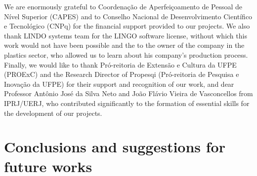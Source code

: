 \documentclass[preprint,12pt,authoryear]{elsarticle}
\begin{document}
We are enormously grateful to Coordenação de Aperfeiçoamento de Pessoal de Nível Superior (CAPES) and to Conselho Nacional de Desenvolvimento Científico e Tecnológico (CNPq) for the financial support provided to our projects. We also thank LINDO systems team for the LINGO software license, without which this work would not have been possible and the to the owner of the company in the plastics sector, who allowed us to learn about his company's production process. Finally, we would like to thank Pró-reitoria de Extensão e Cultura da UFPE (PROExC) and the Research Director of Propesqi (Pró-reitoria de Pesquisa e Inovação da UFPE) for their support and recognition of our work, and dear Professor Antônio José da Silva Neto and João Flávio Vieira de Vasconcellos from IPRJ/UERJ, who contributed significantly to the formation of essential skills for the development of our projects.

\section{Conclusions and suggestions for future works}
\label{sec:conclusions}





\end{document}
